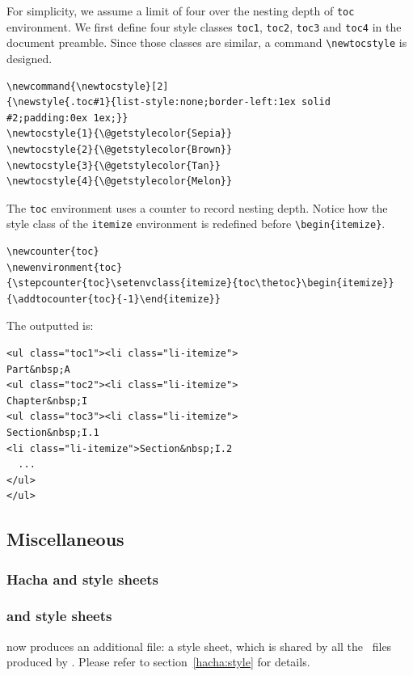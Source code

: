 For simplicity, we assume a limit of four over the nesting depth of
\texttt{toc} environment.
We first define four style classes \texttt{toc1}, \texttt{toc2},
\texttt{toc3} and \texttt{toc4} in the document preamble.
Since those classes are similar, a command \verb+\newtocstyle+ is
designed.
\begin{verbatim}
\newcommand{\newtocstyle}[2]
{\newstyle{.toc#1}{list-style:none;border-left:1ex solid #2;padding:0ex 1ex;}}
\newtocstyle{1}{\@getstylecolor{Sepia}}
\newtocstyle{2}{\@getstylecolor{Brown}}
\newtocstyle{3}{\@getstylecolor{Tan}}
\newtocstyle{4}{\@getstylecolor{Melon}}
\end{verbatim}
The \texttt{toc} environment uses a counter to record nesting depth.
Notice how the style class of the \texttt{itemize} environment is
redefined before \verb+\begin{itemize}+.
\begin{verbatim}
\newcounter{toc}
\newenvironment{toc}
{\stepcounter{toc}\setenvclass{itemize}{toc\thetoc}\begin{itemize}}
{\addtocounter{toc}{-1}\end{itemize}}
\end{verbatim}
The outputted {\html} is:
\begin{verbatim}
<ul class="toc1"><li class="li-itemize">
Part&nbsp;A
<ul class="toc2"><li class="li-itemize">
Chapter&nbsp;I
<ul class="toc3"><li class="li-itemize">
Section&nbsp;I.1
<li class="li-itemize">Section&nbsp;I.2
  ...
</ul>
</ul>
\end{verbatim}

\subsection{Miscellaneous}
\ifpdf
\subsubsection{Hacha and style sheets}
\else
\subsubsection{\hacha{} and style sheets}
\fi
\hacha{} now produces an additional file: a style sheet, which is
shared by all the~{\html} files produced by \hacha.
Please refer to section~\ref{hacha:style} for details.

